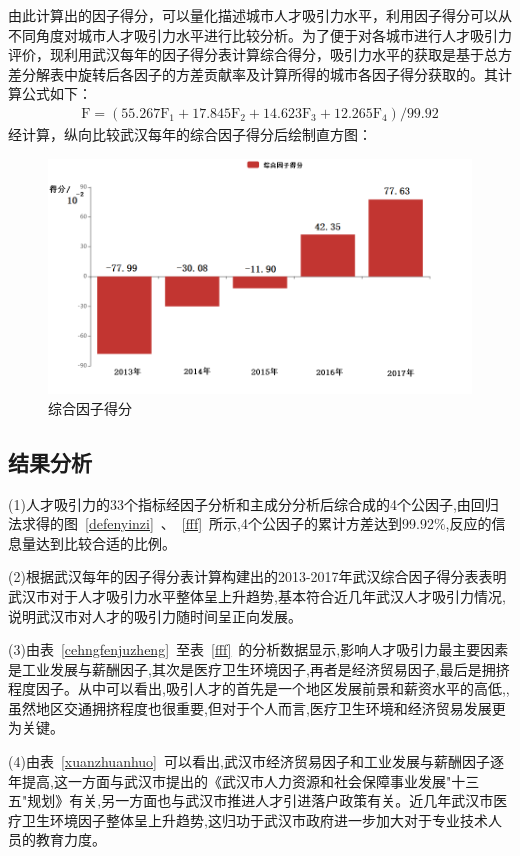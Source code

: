 \documentclass{whutmod}
\begin{document}
\begin{itemize}
	由此计算出的因子得分，可以量化描述城市人才吸引力水平，利用因子得分可以从不同角度对城市人才吸引力水平进行比较分析。为了便于对各城市进行人才吸引力评价，现利用武汉每年的因子得分表计算综合得分，吸引力水平的获取是基于总方差分解表中旋转后各因子的方差贡献率及计算所得的城市各因子得分获取的。其计算公式如下：
	\begin{gather}
	\mathrm { F } = \left( 55.267 \mathrm { F } _ { 1 } + 17.845 \mathrm { F } _ { 2 } + 14.623 \mathrm { F } _ { 3 } + 12.265 \mathrm { F } _ { 4 } \right) / 99.92
	\end{gather}
	经计算，纵向比较武汉每年的综合因子得分后绘制直方图：
		\begin{figure}[H]
		\centering
		\includegraphics[width=\textwidth]{figures/wuhan.png}
		\caption{综合因子得分}
	\end{figure} 
	\subsection{结果分析}

	(1)人才吸引力的33个指标经因子分析和主成分分析后综合成的4个公因子,由回归法求得的图~\ref{defenyinzi}~、~\ref{fff}~所示,4个公因子的累计方差达到99.92\%,反应的信息量达到比较合适的比例。
	
	(2)根据武汉每年的因子得分表计算构建出的2013-2017年武汉综合因子得分表表明武汉市对于人才吸引力水平整体呈上升趋势,基本符合近几年武汉人才吸引力情况,说明武汉市对人才的吸引力随时间呈正向发展。
	
	(3)由表~\ref{cehngfenjuzheng}~至表~\ref{fff}~的分析数据显示,影响人才吸引力最主要因素是工业发展与薪酬因子,其次是医疗卫生环境因子,再者是经济贸易因子,最后是拥挤程度因子。从中可以看出,吸引人才的首先是一个地区发展前景和薪资水平的高低,,虽然地区交通拥挤程度也很重要,但对于个人而言,医疗卫生环境和经济贸易发展更为关键。
	
	(4)由表~\ref{xuanzhuanhuo}~可以看出,武汉市经济贸易因子和工业发展与薪酬因子逐年提高,这一方面与武汉市提出的《武汉市人力资源和社会保障事业发展"十三五"规划》有关,另一方面也与武汉市推进人才引进落户政策有关。近几年武汉市医疗卫生环境因子整体呈上升趋势,这归功于武汉市政府进一步加大对于专业技术人员的教育力度。
	


\end{itemize}
\end{document}
